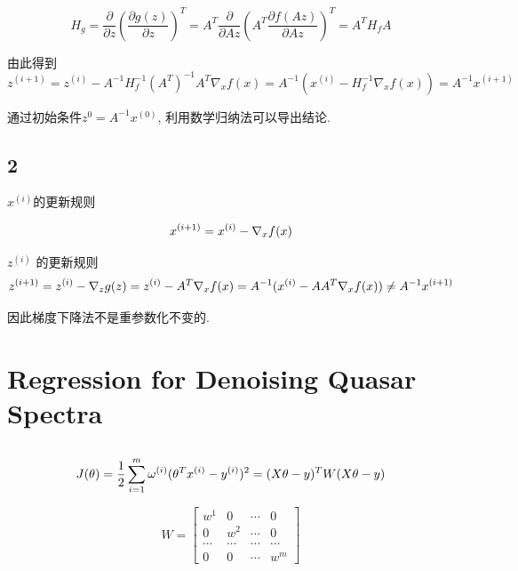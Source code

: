 \documentclass{ctexart}
\begin{document}
\begin{equation}
	H_g = \frac{\partial}{\partial z}(\frac{\partial g(z)}{\partial z})^T = A^T \frac{\partial}{\partial Az}(A^T \frac{\partial f(Az)}{\partial Az})^T = A^T H_f A
\end{equation}

由此得到
\begin{equation}
	z^{(i+1)} = z^{(i)} - A^{-1}H_f^{-1}(A^T)^{-1}A^T\nabla_xf(x) = A^{-1}(x^{(i)} - H_f^{-1}\nabla_xf(x)) = A^{-1}x^{(i+1)}
\end{equation}

通过初始条件$z^{0} = A^{-1} x^{(0)}$, 利用数学归纳法可以导出结论.

\subsection{2}
$x^{(i)}$的更新规则

\begin{equation}
x^{(i+1)} = x^{(i)} -  \nabla_x f(x) \notag
\end{equation}

$z^{(i)}$ 的更新规则
\begin{equation}
z^{(i+1)} = z^{(i)} - \nabla_z g(z) = z^{(i)} - A^T\nabla_x f(x) = A^{-1}(x^{(i)} - AA^T\nabla_x f(x))	\ne A^{-1}x^{(i+1)}\notag
\end{equation}

因此梯度下降法不是重参数化不变的.

\section{Regression for Denoising Quasar Spectra}
\subsection{}
\subsubsection{}
\begin{equation}
	J(\theta) = \frac{1}{2} \sum_{i=1}^{m} \omega^{(i)}(\theta^T x^{(i)} - y^{(i)})^2 = (X\theta - y)^T W(X\theta -y) \notag
\end{equation}

\begin{equation}
	W = \begin{bmatrix}
	w^{1} & 0 & \cdots & 0 \\
	0 & w^{2} & \cdots & 0 \\
	\cdots& \cdots &\cdots & \cdots \\
	0 & 0 & \cdots & w^{m}
	\end{bmatrix}
\end{equation}
\end{document}
